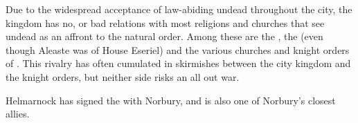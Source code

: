 Due to the widespread acceptance of law-abiding undead throughout the city,
the kingdom has no, or bad relations with most religions and churches that see
undead as an affront to the natural order. Among these are the
, the  (even
though Aleaste was of House Eseriel) and the various churches and knight
orders of . This rivalry has often cumulated in skirmishes
between the city kingdom and the knight orders, but neither side risks an all
out war.

Helmarnock has signed the  with Norbury, and is also
one of Norbury's closest allies.
